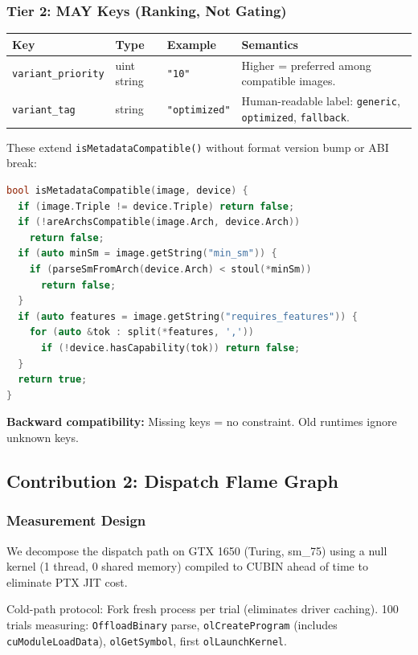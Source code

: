 \documentclass[11pt]{article}
\begin{document}
\subsubsection{Tier 2: MAY Keys (Ranking, Not Gating)}

\begin{center}
\begin{tabular}{llll}
  \toprule
  Key & Type & Example & Semantics \\
  \midrule
  \texttt{variant\_priority} & uint string & \texttt{"10"} & Higher = preferred among compatible images. \\
  \texttt{variant\_tag} & string & \texttt{"optimized"} & Human-readable label: \texttt{generic}, \texttt{optimized}, \texttt{fallback}. \\
  \bottomrule
\end{tabular}
\end{center}

These extend \texttt{isMetadataCompatible()} without format version bump or ABI break:

\begin{lstlisting}[language=C++]
bool isMetadataCompatible(image, device) {
  if (image.Triple != device.Triple) return false;
  if (!areArchsCompatible(image.Arch, device.Arch))
    return false;
  if (auto minSm = image.getString("min_sm")) {
    if (parseSmFromArch(device.Arch) < stoul(*minSm))
      return false;
  }
  if (auto features = image.getString("requires_features")) {
    for (auto &tok : split(*features, ','))
      if (!device.hasCapability(tok)) return false;
  }
  return true;
}
\end{lstlisting}

\textbf{Backward compatibility:} Missing keys = no constraint. Old runtimes ignore unknown keys.

\subsection{Contribution 2: Dispatch Flame Graph}

\subsubsection{Measurement Design}

We decompose the dispatch path on GTX 1650 (Turing, sm\_75) using a null kernel (1 thread, 0 shared memory) compiled to CUBIN ahead of time to eliminate PTX JIT cost.

Cold-path protocol:
Fork fresh process per trial (eliminates driver caching).
100 trials measuring: \texttt{OffloadBinary} parse, \texttt{olCreateProgram} (includes \texttt{cuModuleLoadData}), \texttt{olGetSymbol}, first \texttt{olLaunchKernel}.
\end{document}
